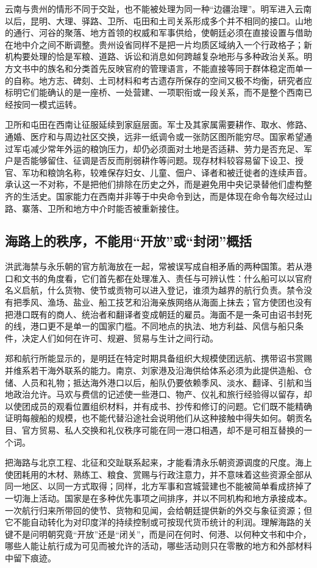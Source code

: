 云南与贵州的情形不同于交趾，也不能被处理为同一种“边疆治理”。明军进入云南以后，昆明、大理、驿路、卫所、屯田和土司关系形成多个并不相同的接口。山地的通行、河谷的聚落、地方首领的权威和军事供给，使朝廷必须在直接设置与借助在地中介之间不断调整。贵州设省同样不是把一片均质区域纳入一个行政格子；新机构要处理的恰是军粮、道路、诉讼和消息如何跨越复杂地形与多种政治关系。明方文书中的族名和分类首先反映官府的管理语言，不能直接等同于群体稳定而单一的自称。地方志、碑刻、土司材料和考古遗存所保存的空间又极不均衡，研究者应标明它们能确认的是一座桥、一处营建、一项职衔或一段关系，而不是整个西南已经按同一模式运转。

卫所和屯田在西南让征服延续到家庭层面。军士及其家属需要耕作、取水、修路、通婚、医疗和与周边社区交换，远非一纸调令或一张防区图所能穷尽。国家希望通过军屯减少常年外运的粮饷压力，却仍必须面对土地是否适耕、劳力是否充足、军户是否能够留住、征调是否反而削弱耕作等问题。现存材料较容易留下设卫、授官、军功和粮饷名称，较难保存妇女、儿童、佃户、译者和被迁徙者的连续声音。承认这一不对称，不是把他们排除在历史之外，而是避免用中央记录替他们虚构整齐的生活史。国家能力在西南并非等于中央命令到达，而是体现在命令每次经过山路、寨落、卫所和地方中介时能否被重新接住。

\subsection{海路上的秩序，不能用“开放”或“封闭”概括}

洪武海禁与永乐朝的官方航海放在一起，常被误写成自相矛盾的两种国策。若从港口和文书的角度看，它们首先都在处理准入、责任与可辨认性：什么船可以以官府名义启航，什么货物、使节或贡物可以进入登记，谁须为越界的航行负责。禁令没有把季风、渔场、盐业、船工技艺和沿海亲族网络从海面上抹去；官方使团也没有把港口既有的商人、统治者和翻译者变成朝廷的雇员。海面不是一条可由诏书封死的线，港口更不是单一的国家门槛。不同地点的执法、地方利益、风信与船只条件，决定人们如何在许可、规避、贸易与生计之间行动。

郑和航行所能显示的，是明廷在特定时期具备组织大规模使团远航、携带诏书赏赐并维系若干海外联系的能力。南京、刘家港及沿海供给体系必须为此提供造船、仓储、人员和礼物；抵达海外港口以后，船队仍要依赖季风、淡水、翻译、引航和当地政治允许。马欢与费信的记述使一些港口、物产、仪礼和旅行经验得以留存，却以使团成员的观看位置组织材料，并有成书、抄传和修订的问题。它们既不能精确证明每艘船的规模，也不能代替沿途社会说明他们从这种接触中得失如何。朝贡名目、官方贸易、私人交换和礼仪秩序可能在同一港口相遇，却不是可相互替换的一个词。

把海路与北京工程、北征和交趾联系起来，才能看清永乐朝资源调度的尺度。海上使团耗用的木材、熟练工、粮食、赏赐与行政注意力，并不意味着这些资源全部从同一地区、以同一方式取得；同样，北方军事和宫城营建也不能被简单看成挤掉了一切海上活动。国家是在多种优先事项之间排序，并以不同机构和地方承接成本。一次航行归来所带回的使节、货物和见闻，会给朝廷提供新的外交与象征资源；但它不能自动转化为对印度洋的持续控制或可按现代货币统计的利润。理解海路的关键不是问明朝究竟“开放”还是“闭关”，而是问在何时、何港、以何种文书和中介，哪些人能让航行成为可见而被允许的活动，哪些活动则只在零散的地方和外部材料中留下痕迹。

